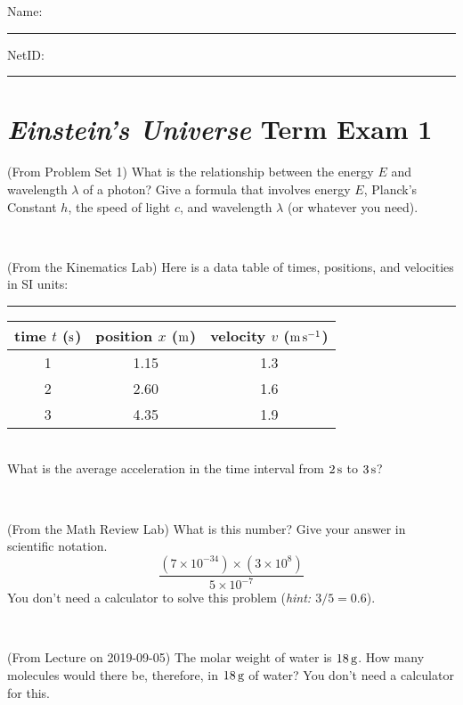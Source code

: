 \documentclass[12pt, letterpaper]{article}
\begin{document}
\noindent
Name: \rule[-1ex]{0.60\textwidth}{0.1pt}
NetID: \rule[-1ex]{0.20\textwidth}{0.1pt}

\section*{\textsl{Einstein's Universe} Term Exam 1}
\setcounter{problem}{1}


\begin{problem} (From Problem Set 1)
What is the relationship between the energy $E$ and wavelength
$\lambda$ of a photon? Give a formula that involves energy $E$,
Planck's Constant $h$, the speed of light $c$, and wavelength
$\lambda$ (or whatever you need).
\end{problem}

\vfill ~

\begin{problem} (From the Kinematics Lab)
Here is a data table of times, positions, and velocities in SI units:\\
\rule{1.0in}{0pt}\begin{tabular}{c|c|c}
time $t$ ($\mathrm{s}$) & position $x$ ($\mathrm{m}$) & velocity $v$ ($\mathrm{m}\,\mathrm{s}^{-1}$) \\
\hline
1 & 1.15 & 1.3 \\
2 & 2.60 & 1.6 \\
3 & 4.35 & 1.9 \\
\hline
\end{tabular}\\
What is the average acceleration in the time interval from $2\,\mathrm{s}$ to $3\,\mathrm{s}$?
\end{problem}


\vfill ~

\begin{problem} (From the Math Review Lab)
What is this number? Give your answer in scientific notation.
$$
\frac{(7\times10^{-34})\times(3\times10^8)}{5\times10^{-7}}
$$
You don't need a calculator to solve this problem (\textit{hint: $3/5=0.6$}).
\end{problem}


\vfill ~

\begin{problem} (From Lecture on 2019-09-05)
The molar weight of water is $18\,\mathrm{g}$. How many molecules would there
be, therefore, in $18\,\mathrm{g}$ of water? You don't need a calculator for
this.
\end{problem}


\vfill ~


\clearpage
\end{document}
